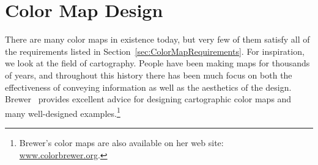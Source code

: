 \documentclass{llncs}
\newcommand{\scite}[1]{~\cite{#1}}
\begin{document}

\section{Color Map Design}
\label{sec:ColorMapDesign}

There are many color maps in existence today, but very few of them satisfy
all of the requirements listed in Section~\ref{sec:ColorMapRequirements}.
For inspiration, we look at the field of cartography.  People
have been making maps for thousands of years, and throughout this history
there has been much focus on both the effectiveness of
conveying information as well as the aesthetics of the design.
Brewer\scite{Brewer05} provides excellent advice for designing cartographic
color maps and many well-designed examples.\footnote{Brewer's color maps
are also available on her web site:
\href{http://www.colorbrewer.org}{www.colorbrewer.org}.}
\end{document}
